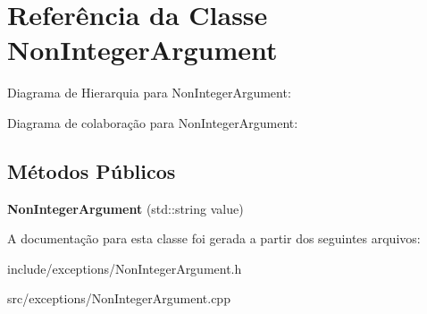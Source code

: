 \hypertarget{classNonIntegerArgument}{}\section{Referência da Classe Non\+Integer\+Argument}
\label{classNonIntegerArgument}


Diagrama de Hierarquia para Non\+Integer\+Argument\+:


Diagrama de colaboração para Non\+Integer\+Argument\+:
\subsection*{Métodos Públicos}
\begin{DoxyCompactItemize}
\item 
\mbox{\label{classNonIntegerArgument_abf05d384a4db481454a900dbad6c22ca}} 
{\bfseries Non\+Integer\+Argument} (std\+::string value)
\end{DoxyCompactItemize}


A documentação para esta classe foi gerada a partir dos seguintes arquivos\+:\begin{DoxyCompactItemize}
\item 
include/exceptions/Non\+Integer\+Argument.\+h\item 
src/exceptions/Non\+Integer\+Argument.\+cpp\end{DoxyCompactItemize}
